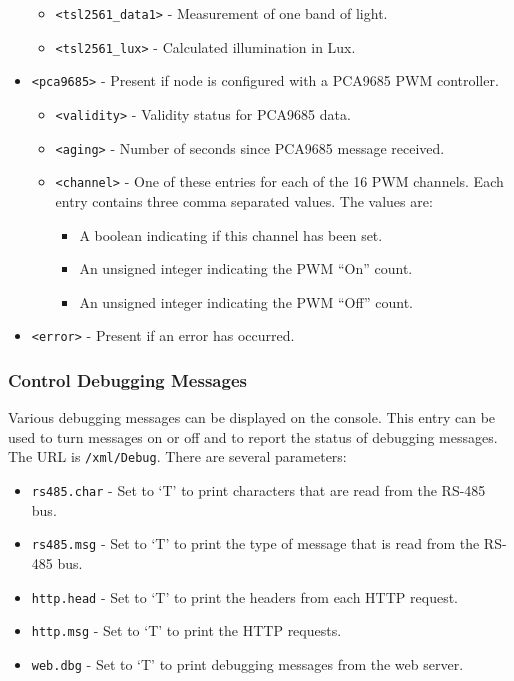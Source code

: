 \documentclass[10pt, openany, draft]{article}
\begin{document}
\begin{itemize}
\begin{itemize}
    \item \texttt{<tsl2561\_data1>} - Measurement of one band of light.
    \item \texttt{<tsl2561\_lux>} - Calculated illumination in Lux.
  \end{itemize}
  \item \texttt{<pca9685>} - Present if node is configured with a PCA9685 PWM controller.
  \begin{itemize}
    \item \texttt{<validity>} - Validity status for PCA9685 data.
    \item \texttt{<aging>} - Number of seconds since PCA9685 message received.
    \item \texttt{<channel>} - One of these entries for each of the 16 PWM channels.  Each entry contains three comma separated values.  The values are:
    \begin{itemize}
      \item A boolean indicating if this channel has been set.
      \item An unsigned integer indicating the PWM ``On'' count.
      \item An unsigned integer indicating the PWM ``Off'' count.
    \end{itemize}
  \end{itemize}
  \item \texttt{<error>} - Present if an error has occurred.
\end{itemize}

\subsubsection{Control Debugging Messages}
Various debugging messages can be displayed on the console.  This entry can be used to turn messages on or off and to report the status of debugging messages.  The URL is \texttt{/xml/Debug}.  There are several parameters:
\begin{itemize}
  \item \texttt{rs485.char} - Set to `T' to print characters that are read from the RS-485 bus.
  \item \texttt{rs485.msg} - Set to `T' to print the type of message that is read from the RS-485 bus.
  \item \texttt{http.head} - Set to `T' to print the headers from each HTTP request.
  \item \texttt{http.msg} - Set to `T' to print the HTTP requests.
  \item \texttt{web.dbg} - Set to `T' to print debugging messages from the web server.
\end{itemize}
\end{document}
